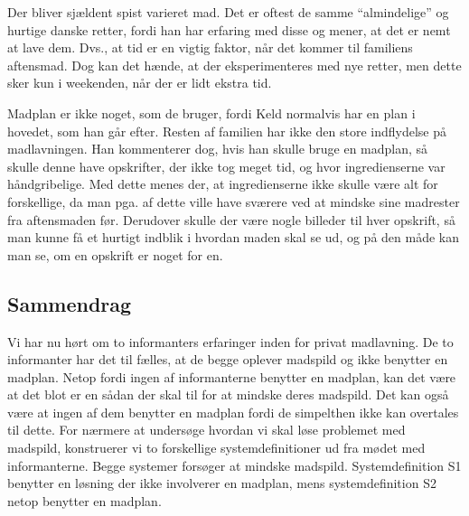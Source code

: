 \begin{description}
Der bliver sjældent spist varieret mad. Det er oftest de samme ``almindelige'' og hurtige danske retter, fordi han har erfaring med disse og mener, at det er nemt at lave dem. Dvs., at tid er en vigtig faktor, når det kommer til familiens aftensmad. Dog kan det hænde, at der eksperimenteres med nye retter, men dette sker kun i weekenden, når der er lidt ekstra tid.

Madplan er ikke noget, som de bruger, fordi Keld normalvis har en plan i hovedet, som han går efter. Resten af familien har ikke den store indflydelse på madlavningen. Han kommenterer dog, hvis han skulle bruge en madplan, så skulle denne have opskrifter, der ikke tog meget tid, og hvor ingredienserne var håndgribelige. Med dette menes der, at ingredienserne ikke skulle være alt for forskellige, da man pga. af dette ville have sværere ved at mindske sine madrester fra aftensmaden før. Derudover skulle der være nogle billeder til hver opskrift, så man kunne få et hurtigt indblik i hvordan maden skal se ud, og på den måde kan man se, om en opskrift er noget for en. 

\end{description}

\subsection{Sammendrag}
Vi har nu hørt om to informanters erfaringer inden for privat madlavning. De to informanter har det til fælles, at de begge oplever madspild og ikke benytter en madplan. Netop fordi ingen af informanterne benytter en madplan, kan det være at det blot er en sådan der skal til for at mindske deres madspild. Det kan også være at ingen af dem benytter en madplan fordi de simpelthen ikke kan overtales til dette. For nærmere at undersøge hvordan vi skal løse problemet med madspild, konstruerer vi to forskellige systemdefinitioner ud fra mødet med informanterne. Begge systemer forsøger at mindske madspild. Systemdefinition S1 benytter en løsning der ikke involverer en madplan, mens systemdefinition S2 netop benytter en madplan.